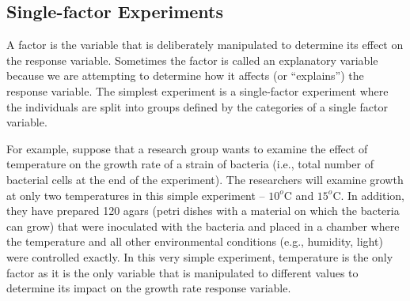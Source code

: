\documentclass[10pt,openany]{book}\usepackage[]{graphicx}\usepackage[]{color}
\begin{document}

\vspace{-12pt}

\subsection{Single-factor Experiments}
A factor is the variable that is deliberately manipulated to determine its effect on the response variable.  Sometimes the factor is called an explanatory variable because we are attempting to determine how it affects (or ``explains'') the response variable.  The simplest experiment is a single-factor experiment where the individuals are split into groups defined by the categories of a single factor variable.

For example, suppose that a research group wants to examine the effect of temperature on the growth rate of a strain of bacteria (i.e., total number of bacterial cells at the end of the experiment).  The researchers will examine growth at only two temperatures in this simple experiment -- $10^{o}$C and $15^{o}$C.  In addition, they have prepared 120 agars (petri dishes with a material on which the bacteria can grow) that were inoculated with the bacteria and placed in a chamber where the temperature and all other environmental conditions (e.g., humidity, light) were controlled exactly.  In this very simple experiment, temperature is the only factor as it is the only variable that is manipulated to different values to determine its impact on the growth rate response variable.


\vspace{-12pt}

\vspace{-12pt}
\end{document}
